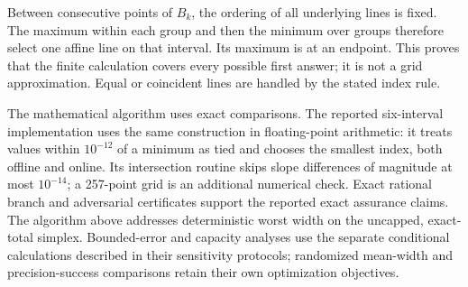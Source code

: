 \documentclass[12pt]{article}
\begin{document}
\begin{center}
\end{center}

Between consecutive points of $B_k$, the ordering of all underlying lines
is fixed.  The maximum within each group and then the minimum over groups
therefore select one affine line on that interval.  Its maximum is at an
endpoint.  This proves that the finite calculation covers every possible
first answer; it is not a grid approximation.  Equal or coincident lines
are handled by the stated index rule.

The mathematical algorithm uses exact comparisons.  The reported
six-interval implementation uses the same construction in floating-point
arithmetic: it treats values within $10^{-12}$ of a minimum as tied and
chooses the smallest index, both offline and online.  Its intersection
routine skips slope differences of magnitude at most $10^{-14}$; a
257-point grid is an additional numerical check.  Exact rational branch
and adversarial certificates support the reported exact assurance claims.
The algorithm above addresses deterministic worst width on the uncapped,
exact-total simplex.  Bounded-error and capacity analyses use the separate
conditional calculations described in their sensitivity protocols;
randomized mean-width and precision-success comparisons retain their own
optimization objectives.
\end{document}
